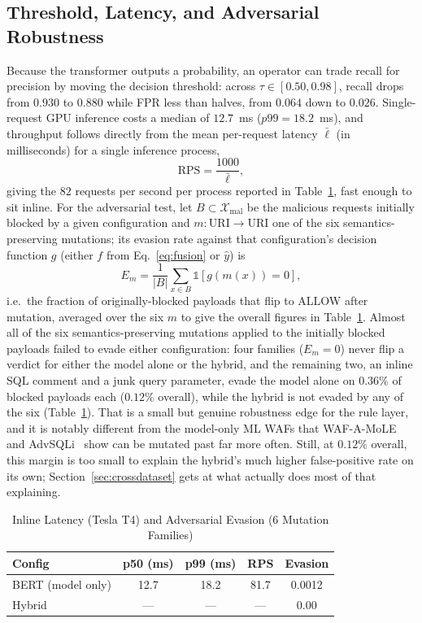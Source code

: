 \documentclass[conference]{IEEEtran}
\begin{document}
\subsection{Threshold, Latency, and Adversarial Robustness}
\label{sec:threshold}
Because the transformer outputs a probability, an operator can trade
recall for precision by moving the decision threshold: across
$\tau\in[0.50,0.98]$, recall drops from $0.930$ to $0.880$ while
FPR less than halves, from $0.064$ down to $0.026$.
Single-request GPU inference costs a median
of $12.7$~ms ($p99{=}18.2$~ms), and throughput follows directly from
the mean per-request latency $\bar\ell$ (in milliseconds) for a single
inference process,
\begin{equation}
\mathrm{RPS} = \frac{1000}{\bar\ell},
\label{eq:rps}
\end{equation}
giving the $82$ requests per second per process reported in
Table~\ref{tab:latency}, fast enough to sit inline. For the adversarial
test, let $B\subset\mathcal{X}_{\text{mal}}$ be the malicious requests
initially blocked by a given configuration and $m:\text{URI}\to\text{URI}$
one of the six semantics-preserving mutations; its evasion rate against
that configuration's decision function $g$ (either $f$ from
Eq.~\eqref{eq:fusion} or $\hat y$) is
\begin{equation}
E_m = \frac{1}{|B|}\sum_{x\in B} \mathbb{1}[g(m(x))=0],
\label{eq:evasion}
\end{equation}
i.e.\ the fraction of originally-blocked payloads that flip to
ALLOW after mutation, averaged over the six $m$ to give the
overall figures in Table~\ref{tab:latency}. Almost all of the six
semantics-preserving mutations applied to the initially blocked
payloads failed to evade either configuration: four families ($E_m=0$)
never flip a verdict for either the model alone or the hybrid, and the
remaining two, an inline SQL comment and a junk query parameter, evade
the model alone on $0.36\%$ of blocked payloads each ($0.12\%$ overall),
while the hybrid is not evaded by any of the six (Table~\ref{tab:latency}).
That is a small but genuine robustness edge for the rule layer, and it
is notably different from the model-only ML WAFs that
WAF-A-MoLE~\cite{demetrio2020wafamole} and AdvSQLi~\cite{advsqli2024}
show can be mutated past far more often. Still, at $0.12\%$ overall,
this margin is too small to explain the hybrid's much higher
false-positive rate on its own; Section~\ref{sec:crossdataset} gets at
what actually does most of that explaining.

\begin{table}[t]
\centering
\caption{Inline Latency (Tesla T4) and Adversarial Evasion (6 Mutation Families)}
\label{tab:latency}
\begin{tabular}{@{}lcccc@{}}
\toprule
Config & p50 (ms) & p99 (ms) & RPS & Evasion \\
\midrule
BERT (model only) & 12.7 & 18.2 & 81.7 & 0.0012 \\
Hybrid & --- & --- & --- & 0.00 \\
\bottomrule
\end{tabular}
\end{table}
\end{document}
